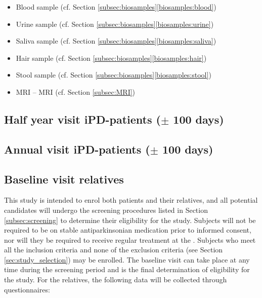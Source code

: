 \begin{itemize}[noitemsep,topsep=0pt]
\item Blood sample (cf. Section \ref{subsec:biosamples}\ref{biosamples:blood})
\item Urine sample (cf. Section \ref{subsec:biosamples}\ref{biosamples:urine})
\item Saliva sample (cf. Section \ref{subsec:biosamples}\ref{biosamples:saliva})
\item Hair sample (cf. Section \ref{subsec:biosamples}\ref{biosamples:hair})
\item Stool sample (cf. Section \ref{subsec:biosamples}\ref{biosamples:stool})
\item \acl{MRI} -- \acs{MRI} (cf. Section \ref{subsec:MRI}) 
\end{itemize}

\subsection{Half year visit \ac{iPD}-patients ($\pm$ 100 days)}
\subsection{Annual visit \ac{iPD}-patients ($\pm$ 100 days)}
 
\subsection{Baseline visit relatives}
This study is intended to enrol both patients and their relatives, and all potential candidates will undergo the screening procedures listed in Section \ref{subsec:screening} to determine their eligibility for the study. Subjects will not be required to be on stable antiparkinsonian medication prior to informed consent, nor will they be required to receive regular treatment at the \UKGM. Subjects who meet all the inclusion criteria and none of the exclusion criteria (see Section \ref{sec:study_selection}) may be enrolled. The baseline visit can take place at any time during the screening period and is the final determination of eligibility for the study. For the relatives, the following data will be collected through questionnaires:

